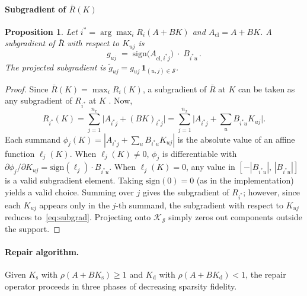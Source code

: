 \documentclass[conference]{IEEEtran}
\newtheorem{proposition}{Proposition}
\begin{document}
\paragraph{Subgradient of $\bar{R}(K)$}

\begin{proposition}\label{prop:subgrad}
Let $i^*=\arg\max_i R_i(A+BK)$ and
$A_{\mathrm{cl}}=A+BK$.  A subgradient of\/ $\bar{R}$ with respect to
$K_{uj}$ is
\begin{equation}\label{eq:subgrad}
  g_{uj} \;=\; \mathrm{sign}\!\bigl(A_{\mathrm{cl},i^*j}\bigr)
               \;\cdot\; B_{i^*u}\,.
\end{equation}
The projected subgradient is
$\tilde{g}_{uj}=g_{uj}\,\mathbf{1}_{(u,j)\in\mathcal{S}}$.
\end{proposition}

\begin{proof}
Since $\bar{R}(K)=\max_i R_i(K)$, a subgradient of $\bar{R}$ at $K$
can be taken as any subgradient of $R_{i^*}$ at $K$
\cite[Sec.~3.1.2]{shin}.  Now,
\[
  R_{i^*}(K) = \sum_{j=1}^{n_x} \bigl|A_{i^*j} + (BK)_{i^*j}\bigr|
  = \sum_{j=1}^{n_x} \bigl|A_{i^*j} + \textstyle\sum_u B_{i^*u}K_{uj}\bigr|.
\]
Each summand $\phi_j(K)=|A_{i^*j}+\sum_u B_{i^*u}K_{uj}|$ is
the absolute value of an affine function $\ell_j(K)$.  When
$\ell_j(K)\neq 0$, $\phi_j$ is differentiable with
$\partial\phi_j/\partial K_{uj}=\mathrm{sign}(\ell_j)\cdot B_{i^*u}$.
When $\ell_j(K)=0$, any value in
$[-|B_{i^*u}|,\,|B_{i^*u}|]$ is a valid subgradient element.
Taking $\mathrm{sign}(0)=0$ (as in the implementation) yields a valid
choice.  Summing over $j$ gives the subgradient of $R_{i^*}$; however,
since each $K_{uj}$ appears only in the $j$-th summand, the
subgradient with respect to $K_{uj}$ reduces to~\eqref{eq:subgrad}.
Projecting onto $\mathcal{K}_{\mathcal{S}}$ simply zeros out
components outside the support.
\end{proof}


\paragraph{Repair algorithm.}
Given $K_{\mathrm{s}}$ with $\rho(A+BK_{\mathrm{s}})\ge 1$ and
$K_{\mathrm{d}}$ with $\rho(A+BK_{\mathrm{d}})<1$, the repair
operator proceeds in three phases of decreasing sparsity fidelity.
\end{document}
